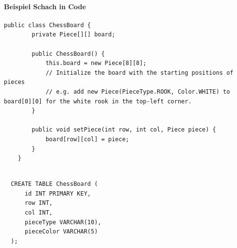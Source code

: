 \begin{frame}[fragile]
  \noindent\begin{minipage}{\textwidth}
  \framesubtitle{Beispiel Schach in Code}
    \begin{lstlisting}[caption={Schachbrett - Objektorientiert},captionpos=b,label={lst:schachbrett-oo}]
    public class ChessBoard {
        private Piece[][] board;

        public ChessBoard() {
            this.board = new Piece[8][8];
            // Initialize the board with the starting positions of pieces
            // e.g. add new Piece(PieceType.ROOK, Color.WHITE) to board[0][0] for the white rook in the top-left corner.
        }

        public void setPiece(int row, int col, Piece piece) {
            board[row][col] = piece;
        }
    }
  \end{lstlisting}
  \end{minipage}
\end{frame}

\begin{frame}[fragile]
  \begin{lstlisting}[caption={Schachbrett - Datenbank},captionpos=b,label={lst:schachbrett-datenbank}]

  CREATE TABLE ChessBoard (
      id INT PRIMARY KEY,
      row INT,
      col INT,
      pieceType VARCHAR(10),
      pieceColor VARCHAR(5)
  );
\end{lstlisting}
\end{frame}
